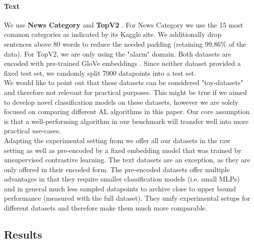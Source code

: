 \documentclass[]{article}
\begin{document}
\paragraph{Text}
We use \textbf{News Category} \cite{misra2022news} and \textbf{TopV2} \cite{chen-etal-2020-low-resource}.
For News Category we use  the 15 most common categories as indicated by its Kaggle site.
We additionally drop sentences above 80 words to reduce the needed padding (retaining 99,86\% of the data).
For TopV2, we are only using the "alarm" domain.
Both datasets are encoded with pre-trained GloVe embeddings \cite{pennington2014glove}.
Since neither dataset provided a fixed test set, we randomly split 7000 datapoints into a test set. \\ [3mm]
%
We would like to point out that these datasets can be considered "toy-datasets" and therefore not relevant for practical purposes.
This might be true if we aimed to develop novel classification models on these datasets, however we are solely focused on comparing different AL algorithms in this paper.
Our core assumption is that a well-performing algorithm in our benchmark will transfer well into more practical use-cases. \\ [1mm]
Adapting the experimental setting from \cite{hacohen2022active} we offer all our datasets in the raw setting as well as pre-encoded by a fixed embedding model that was trained by unsupervised contrastive learning. 
The text datasets are an exception, as they are only offered in their encoded form.
The pre-encoded datasets offer multiple advantages in that they require smaller classification models (i.e. small MLPs) and in general much less sampled datapoints to archive close to upper bound performance (measured with the full dataset).
They unify experimental setups for different datasets and therefore make them much more comparable.

\subsection{Results}
\end{document}
